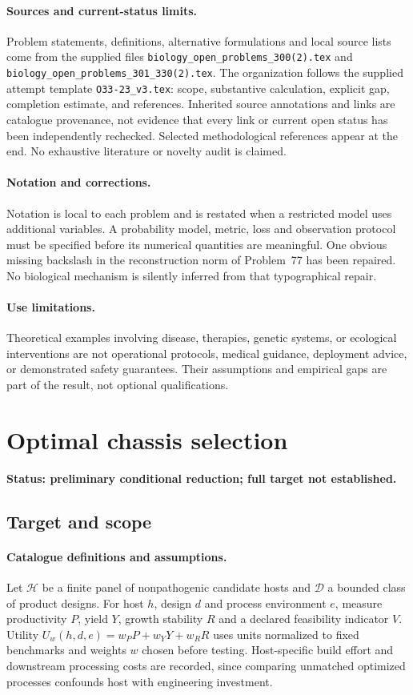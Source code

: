 \documentclass[11pt]{article}
\begin{document}
\paragraph{Sources and current-status limits.}
Problem statements, definitions, alternative formulations and local source lists
come from the supplied files
\texttt{biology\_open\_problems\_300(2).tex} and
\texttt{biology\_open\_problems\_301\_330(2).tex}.
The organization follows the supplied attempt template
\texttt{O33-23\_v3.tex}: scope, substantive calculation, explicit gap,
completion estimate, and references. Inherited source annotations and links are
catalogue provenance, not evidence that every link or current open status has
been independently rechecked. Selected methodological references appear at the
end. No exhaustive literature or novelty audit is claimed.

\paragraph{Notation and corrections.}
Notation is local to each problem and is restated when a restricted model uses
additional variables. A probability model, metric, loss and observation protocol
must be specified before its numerical quantities are meaningful. One obvious
missing backslash in the reconstruction norm of Problem~77 has been repaired.
No biological mechanism is silently inferred from that typographical repair.

\paragraph{Use limitations.}
Theoretical examples involving disease, therapies, genetic systems, or ecological
interventions are not operational protocols, medical guidance, deployment advice,
or demonstrated safety guarantees. Their assumptions and empirical gaps are part
of the result, not optional qualifications.


\section*{Optimal chassis selection}
\label{prob:266}
\noindent\textbf{Status: preliminary conditional reduction; full target not established.}
\subsection{Target and scope}
\paragraph{Catalogue definitions and assumptions.}
Let $\mathcal H$ be a finite panel of nonpathogenic candidate hosts and $\mathcal D$ a bounded class of product designs. For host $h$, design $d$ and process environment $e$, measure productivity $P$, yield $Y$, growth stability $R$ and a declared feasibility indicator $V$. Utility $U_w(h,d,e)=w_PP+w_YY+w_RR$ uses units normalized to fixed benchmarks and weights $w$ chosen before testing. Host-specific build effort and downstream processing costs are recorded, since comparing unmatched optimized processes confounds host with engineering investment.
\end{document}
